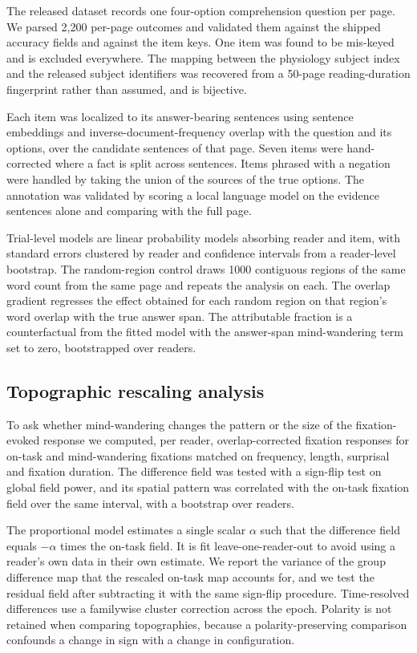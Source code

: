 \documentclass[11pt]{article}
\begin{document}
The released dataset records one four-option comprehension question per page. We parsed
2{,}200 per-page outcomes and validated them against the shipped accuracy fields and against the
item keys. One item was found to be mis-keyed and is excluded everywhere. The mapping between
the physiology subject index and the released subject identifiers was recovered from a 50-page
reading-duration fingerprint rather than assumed, and is bijective.

Each item was localized to its answer-bearing sentences using sentence embeddings and
inverse-document-frequency overlap with the question and its options, over the candidate
sentences of that page. Seven items were hand-corrected where a fact is split across sentences.
Items phrased with a negation were handled by taking the union of the sources of the true
options. The annotation was validated by scoring a local language model on the evidence
sentences alone and comparing with the full page.

Trial-level models are linear probability models absorbing reader and item, with standard errors
clustered by reader and confidence intervals from a reader-level bootstrap. The random-region
control draws 1000 contiguous regions of the same word count from the same page and repeats the
analysis on each. The overlap gradient regresses the effect obtained for each random region on
that region's word overlap with the true answer span. The attributable fraction is a
counterfactual from the fitted model with the answer-span mind-wandering term set to zero,
bootstrapped over readers.

\subsection{Topographic rescaling analysis}

To ask whether mind-wandering changes the pattern or the size of the fixation-evoked response we
computed, per reader, overlap-corrected fixation responses for on-task and mind-wandering
fixations matched on frequency, length, surprisal and fixation duration. The difference field was
tested with a sign-flip test on global field power, and its spatial pattern was correlated with
the on-task fixation field over the same interval, with a bootstrap over readers.

The proportional model estimates a single scalar $\alpha$ such that the difference field equals
$-\alpha$ times the on-task field. It is fit leave-one-reader-out to avoid using a reader's own
data in their own estimate. We report the variance of the group difference map that the rescaled
on-task map accounts for, and we test the residual field after subtracting it with the same
sign-flip procedure. Time-resolved differences use a familywise cluster correction across the
epoch. Polarity is not retained when comparing topographies, because a polarity-preserving
comparison confounds a change in sign with a change in configuration.
\end{document}
